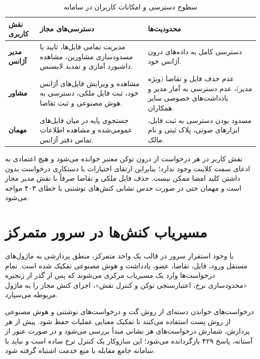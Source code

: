 \documentclass[11pt, a4paper]{report}
\begin{document}
\begin{table}[htbp]
\centering
\caption{سطوح دسترسی و امکانات کاربران در سامانه}
\label{tab:rbac}
\renewcommand{\arraystretch}{1.5}
\begin{tabular}{|p{2.6cm}|p{5.5cm}|p{5.7cm}|}
\hline
\textbf{نقش کاربری} & \textbf{دسترسی‌های مجاز} & \textbf{محدودیت‌ها} \\ \hline
\textbf{مدیر آژانس} & مدیریت تمامی فایل‌ها، تایید یا مسدودسازی مشاورین، مشاهده داشبورد آماری و تمدید لایسنس. & دسترسی کامل به داده‌های درون آژانس خود. \\ \hline
\textbf{مشاور} & مشاهده و ویرایش فایل‌های آژانس خود، ثبت فایل ملکی، دسترسی به هوش مصنوعی و ثبت تقاضا. & عدم حذف فایل و تقاضا (ویژه مدیر)، عدم دسترسی به آمار مدیر و یادداشت‌های خصوصی سایر همکاران. \\ \hline
\textbf{مهمان} & جستجوی پایه در میان فایل‌های عمومی‌شده و مشاهده اطلاعات تماس دفتر آژانس. & مسدود بودن دسترسی به ثبت فایل، ابزارهای صوتی، پلاک ثبتی و نام مالک. \\ \hline
\end{tabular}
\end{table}

نقش کاربر در هر درخواست از درون توکن معتبر خوانده می‌شود و هیچ اعتمادی به ادعای سمت کلاینت وجود ندارد؛ بنابراین ارتقای اختیارات با دستکاری درخواست بدون داشتن کلید امضا ممکن نیست. حذف فایل ملکی و تقاضا صرفاً با نقش مدیر مجاز است و مهمان حتی در صورت حدس نشانی کنش‌های نوشتنی با خطای ۴۰۳ مواجه می‌شود.

\section{مسیریاب کنش‌ها در سرور متمرکز}
با وجود استقرار سرور در قالب یک واحد متمرکز، منطق پردازشی به ماژول‌های مستقل ورود، فایل، تقاضا، عضو، یادداشت و هوش مصنوعی تفکیک شده است. تمام درخواست‌ها وارد یک مسیریاب مرکزی می‌شوند که پس از گذر از زنجیره «محدودسازی نرخ، اعتبارسنجی توکن و کنترل نقش»، اجرای کنش مجاز را به ماژول مربوطه می‌سپارد.

درخواست‌های خواندن دسته‌ای از روش گت و درخواست‌های نوشتنی و هوش مصنوعی از روش پست استفاده می‌کنند تا تفکیک معنایی عملیات حفظ شود. پیش از هر پردازش، شمارش درخواست‌های هر نشانی مبدأ بررسی می‌شود و در صورت عبور از آستانه، پاسخ ۴۲۹ بازگردانده می‌شود؛ این سازوکار یک کنترل نرخ ساده است و نباید با سامانه جامع مقابله با منع خدمت اشتباه گرفته شود.
\end{document}
